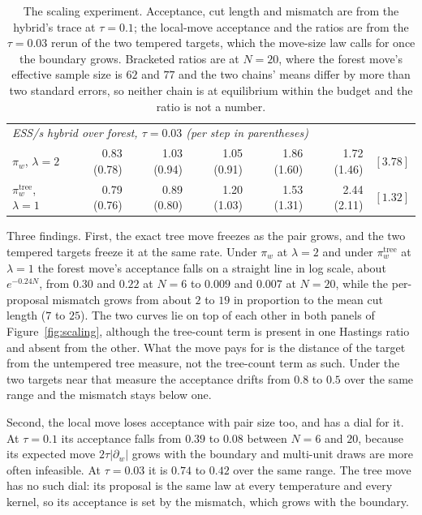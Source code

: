 \documentclass[11pt]{article}
\begin{document}
\begin{table}[htbp]
\begin{tabular}{lrrrrrr}
\multicolumn{7}{l}{\emph{ESS/s hybrid over forest, $\tau = 0.03$ (per step in parentheses)}} \\
$\pi_w$, $\lambda{=}2$ & 0.83 (0.78) & 1.03 (0.94) & 1.05 (0.91) & 1.86 (1.60) & 1.72 (1.46) & $[3.78]$ \\
$\pi_w^{\mathrm{tree}}$, $\lambda{=}1$ & 0.79 (0.76) & 0.89 (0.80) & 1.20 (1.03) & 1.53 (1.31) & 2.44 (2.11) & $[1.32]$ \\
\bottomrule
\end{tabular}
\caption{The scaling experiment. Acceptance, cut length and mismatch
  are from the hybrid's trace at $\tau = 0.1$; the local-move
  acceptance and the ratios are from the $\tau = 0.03$ rerun of the
  two tempered targets, which the move-size law calls for once the
  boundary grows. Bracketed ratios are at $N = 20$, where the forest
  move's effective sample size is $62$ and $77$ and the two chains'
  means differ by more than two standard errors, so neither chain is
  at equilibrium within the budget and the ratio is not a
  number.}\label{tab:scaling}
\end{table}

Three findings. First, the exact tree move freezes as the pair grows,
and the two tempered targets freeze it at the same rate. Under $\pi_w$
at $\lambda = 2$ and under $\pi_w^{\mathrm{tree}}$ at $\lambda = 1$
the forest move's acceptance falls on a straight line in log scale,
about $e^{-0.24 N}$, from $0.30$ and $0.22$ at $N = 6$ to $0.009$ and
$0.007$ at $N = 20$, while the per-proposal mismatch grows from about
$2$ to $19$ in proportion to the mean cut length ($7$ to $25$). The
two curves lie on top of each other in both panels of
Figure~\ref{fig:scaling}, although the tree-count term is present in
one Hastings ratio and absent from the other. What the move pays for
is the distance of the target from the untempered tree measure, not
the tree-count term as such. Under the two targets near that measure
the acceptance drifts from $0.8$ to $0.5$ over the same range and the
mismatch stays below one.

Second, the local move loses acceptance with pair size too, and has a
dial for it. At $\tau = 0.1$ its acceptance falls from $0.39$ to
$0.08$ between $N = 6$ and $20$, because its expected move
$2\tau|\partial_w|$ grows with the boundary and multi-unit draws are
more often infeasible. At $\tau = 0.03$ it is $0.74$ to $0.42$ over
the same range. The tree move has no such dial: its proposal is the
same law at every temperature and every kernel, so its acceptance is
set by the mismatch, which grows with the boundary.
\end{document}

